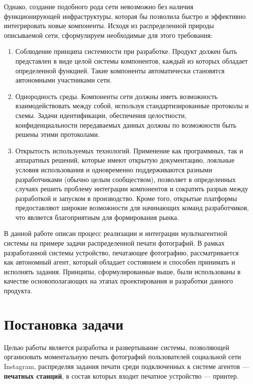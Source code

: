 \documentclass[a4paper,14pt,href]{article}
\begin{document}
Однако, создание подобного рода сети невозможно без наличия функционирующей инфраструктуры, которая бы позволила быстро
и эффективно интегрировать новые компоненты. Исходя из распределенной природы описываемой сети, сформулируем необходимые
для этого требования:

\begin{enumerate}
  \item Соблюдение принципа системности при разработке\cite{SystemPrinciple}. Продукт должен быть представлен в виде
  целой системы компонентов, каждый из которых обладает определенной функцией. Такие компоненты автоматически становятся
  автономными участниками сети.

  \item Однородность среды. Компоненты сети должны иметь возможность взаимодействовать между собой, используя
  стандартизированные протоколы и схемы. Задачи идентификации, обеспечения целостности, конфиденциальности передаваемых
  данных должны по возможности быть решены этими протоколами.

  \item Открытость используемых технологий. Применение как программных, так и аппаратных решений, которые имеют
  открытую документацию, лояльные  условия использования и одновременно поддерживаются разными разработчиками
  (обычно целым сообществом), позволяет в определенных случаях решить проблему интеграции компонентов и сократить разрыв
  между разработкой и запуском в производство. Кроме того, открытые платформы предоставляют широкие возможности для
  начинающих команд разработчиков, что является благоприятным для формирования рынка.
\end{enumerate}

В данной работе описан процесс реализации и интеграции муль\-тиагентной системы на примере задачи распределенной
печати фотографий. В рамках разработанной системы устройство, печатающее фотографию, рассматривается как автономный
агент, который обладает состоянием и способен принимать и исполнять задания. Принципы, сформулированные выше, были
использованы в качестве основополагающих на этапах проектирования и разработки данного продукта.

\newpage
\section*{Постановка задачи}
Целью работы является разработка и развертывание системы, позволяющей организовать моментальную печать фотографий
пользователей социальной сети Instagram, распределяя задания печати среди подключенных к системе агентов ---
\textbf{печатных станций}, в состав которых входит печатное устройство --- принтер.
\end{document}
